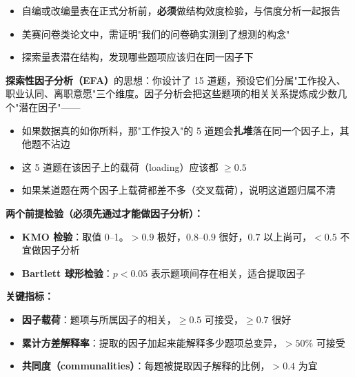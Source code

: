 \begin{algoscene}
\begin{itemize}
    \item 自编或改编量表在正式分析前，\textbf{必须}做结构效度检验，与信度分析一起报告
    \item 美赛问卷类论文中，需证明"我们的问卷确实测到了想测的构念"
    \item 探索量表潜在结构，发现哪些题项应该归在同一因子下
\end{itemize}
\end{algoscene}

\begin{algoprinciple}
\textbf{探索性因子分析（EFA）}的思想：你设计了 15 道题，预设它们分属"工作投入、职业认同、离职意愿"三个维度。因子分析会把这些题项的相关关系提炼成少数几个"潜在因子"——

\begin{itemize}
    \item 如果数据真的如你所料，那"工作投入"的 5 道题会\textbf{扎堆}落在同一个因子上，其他题不沾边
    \item 这 5 道题在该因子上的载荷（loading）应该都 $\geq 0.5$
    \item 如果某道题在两个因子上载荷都差不多（交叉载荷），说明这道题归属不清
\end{itemize}

\textbf{两个前提检验（必须先通过才能做因子分析）：}
\begin{itemize}
    \item \textbf{KMO 检验}：取值 0--1。$>0.9$ 极好，$0.8$--$0.9$ 很好，$0.7$ 以上尚可，$<0.5$ 不宜做因子分析
    \item \textbf{Bartlett 球形检验}：$p<0.05$ 表示题项间存在相关，适合提取因子
\end{itemize}

\textbf{关键指标：}
\begin{itemize}
    \item \textbf{因子载荷}：题项与所属因子的相关，$\geq 0.5$ 可接受，$\geq 0.7$ 很好
    \item \textbf{累计方差解释率}：提取的因子加起来能解释多少题项总变异，$>50\%$ 可接受
    \item \textbf{共同度（communalities）}：每题被提取因子解释的比例，$>0.4$ 为宜
\end{itemize}
\end{algoprinciple}

